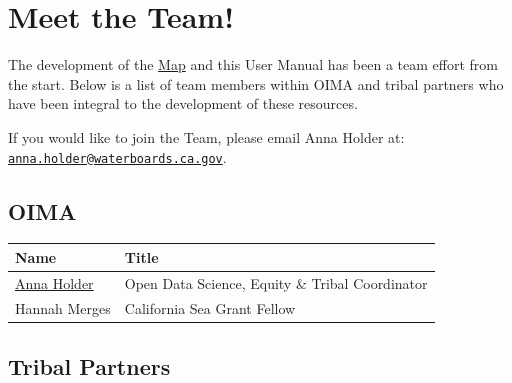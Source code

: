 \documentclass[
  letterpaper,
  DIV=11,
  numbers=noendperiod]{scrreprt}
\begin{document}
\chapter{Meet the Team!}\label{meet-the-team}

The development of the
\href{https://gispublic.waterboards.ca.gov/portal/home/item.html?id=a71c1841907240e1a4d896c8cf2302a8}{Map}
and this User Manual has been a team effort from the start. Below is a
list of team members within OIMA and tribal partners who have been
integral to the development of these resources.

If you would like to join the Team, please email Anna Holder at:
\href{mailto:anna.holder@waterboards.ca.gov}{\nolinkurl{anna.holder@waterboards.ca.gov}}.

\section{OIMA}\label{oima}

\begin{longtable}[]{@{}
  >{\raggedright\arraybackslash}p{}
  >{\raggedright\arraybackslash}p{}@{}}
\toprule\noalign{}
\begin{minipage}[b]{\linewidth}\raggedright
Name
\end{minipage} & \begin{minipage}[b]{\linewidth}\raggedright
Title
\end{minipage} \\
\midrule\noalign{}
\endhead
\bottomrule\noalign{}
\endlastfoot
\href{mailto:anna.holder@waterboards.ca.gov}{Anna Holder} & Open Data
Science, Equity \& Tribal Coordinator \\
Hannah Merges & 2025 California Sea Grant Fellow \\
\end{longtable}

\section{Tribal Partners}\label{tribal-partners}
\end{document}
